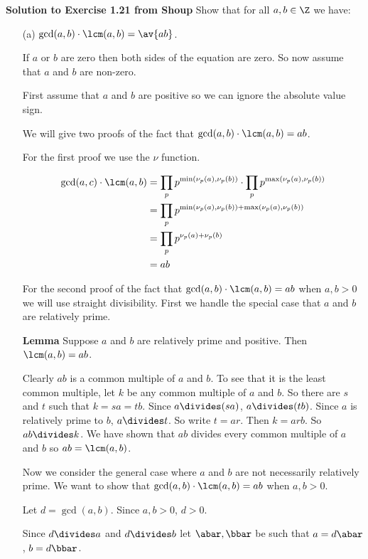 \documentclass[oneside,12pt]{amsart}
\begin{document}
\textbf{Solution to Exercise 1.21 from Shoup} Show that for all $a,b\in\Z$ we have:
\begin{enumerate}
\item[(a)] $\gcd(a,b) \cdot \lcm(a,b) = \av{ab}$.

If $a$ or $b$ are zero then both sides of the equation are zero. So now assume that $a$ and $b$ are non-zero.

First assume that $a$ and $b$ are positive so we can ignore the absolute value sign.

We will give two proofs of the fact that $\gcd(a,b) \cdot \lcm(a,b) = ab$.

For the first proof we use the $\nu$ function.

\begin{align*}
\gcd(a,c) \cdot \lcm(a,b)  &=  \prod_p p^{\min\left(\nu_p(a),\nu_p(b)\right)}\cdot \prod_p p^{\max\left(\nu_p(a),\nu_p(b)\right)} \\
           &= \prod_p p^{\min\left(\nu_p(a),\nu_p(b)\right)+\max\left(\nu_p(a),\nu_p(b)\right)} \\
           &= \prod_p p^{\nu_p(a) + \nu_p(b)} \\
           &= ab \\
\end{align*}


For the second proof of the fact that $\gcd(a,b) \cdot \lcm(a,b) = ab$ when $a,b>0$ we will use straight divisibility.
First we handle the special case that $a$ and $b$ are relatively prime.

\textbf{Lemma} Suppose $a$ and $b$ are relatively prime and positive. Then $\lcm(a,b) = ab$.
\begin{subproof}
Clearly $ab$ is a common multiple of $a$ and $b$. To see that it is the least common multiple, let
$k$ be any common multiple of $a$ and $b$. So there are $s$ and $t$ such that $k=sa=tb$.
Since $a\divides (sa)$, $a\divides (tb)$. Since $a$ is relatively prime to $b$, $a\divides t$. 
So write $t=ar$. Then $k=arb$. So $ab\divides k$. We have shown that $ab$ divides every common multiple of 
$a$ and $b$ so $ab=\lcm(a,b)$.
\end{subproof}

Now we consider the general case where $a$ and $b$ are not necessarily relatively prime. We want to show that
$\gcd(a,b) \cdot \lcm(a,b) = ab$ when $a,b>0$.

Let $d=\gcd(a,b)$. Since $a,b>0$, $d>0$.


Since $d\divides a$ and $d\divides b$ let $\abar, \bbar$ be such that
$a=d\abar$, $b=d\bbar$. 


\end{enumerate}
\end{document}
